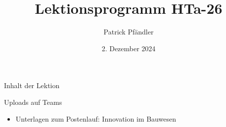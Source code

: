 



\title{\textbf{Lektionsprogramm HTa-26}}
\author{Patrick Pfändler}
\date{2. Dezember 2024}




\frame{\titlepage}

\begin{frame}{Inhalt der Lektion}
	\tableofcontents
\end{frame}







\begin{frame}{Uploads auf Teams}
	\begin{itemize}
		\item[\textbullet] Unterlagen zum Postenlauf: Innovation im Bauwesen
	\end{itemize}
	
\end{frame}

\folieFragen
{}


